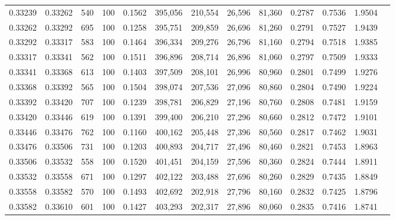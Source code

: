 \begin{tabular}{rrrrrrrrrrrrr}
0.33239 & 0.33262 &    540 & 100 &                                     0.1562 & 395,056 & 210,554 &  26,596 &  81,360 & 0.2787 & 0.7536 & 1.9504 \\
0.33262 & 0.33292 &    695 & 100 &                                     0.1258 & 395,751 & 209,859 &  26,696 &  81,260 & 0.2791 & 0.7527 & 1.9439 \\
0.33292 & 0.33317 &    583 & 100 &                                     0.1464 & 396,334 & 209,276 &  26,796 &  81,160 & 0.2794 & 0.7518 & 1.9385 \\
0.33317 & 0.33341 &    562 & 100 &                                     0.1511 & 396,896 & 208,714 &  26,896 &  81,060 & 0.2797 & 0.7509 & 1.9333 \\
0.33341 & 0.33368 &    613 & 100 &                                     0.1403 & 397,509 & 208,101 &  26,996 &  80,960 & 0.2801 & 0.7499 & 1.9276 \\
0.33368 & 0.33392 &    565 & 100 &                                     0.1504 & 398,074 & 207,536 &  27,096 &  80,860 & 0.2804 & 0.7490 & 1.9224 \\
0.33392 & 0.33420 &    707 & 100 &                                     0.1239 & 398,781 & 206,829 &  27,196 &  80,760 & 0.2808 & 0.7481 & 1.9159 \\
0.33420 & 0.33446 &    619 & 100 &                                     0.1391 & 399,400 & 206,210 &  27,296 &  80,660 & 0.2812 & 0.7472 & 1.9101 \\
0.33446 & 0.33476 &    762 & 100 &                                     0.1160 & 400,162 & 205,448 &  27,396 &  80,560 & 0.2817 & 0.7462 & 1.9031 \\
0.33476 & 0.33506 &    731 & 100 &                                     0.1203 & 400,893 & 204,717 &  27,496 &  80,460 & 0.2821 & 0.7453 & 1.8963 \\
0.33506 & 0.33532 &    558 & 100 &                                     0.1520 & 401,451 & 204,159 &  27,596 &  80,360 & 0.2824 & 0.7444 & 1.8911 \\
0.33532 & 0.33558 &    671 & 100 &                                     0.1297 & 402,122 & 203,488 &  27,696 &  80,260 & 0.2829 & 0.7435 & 1.8849 \\
0.33558 & 0.33582 &    570 & 100 &                                     0.1493 & 402,692 & 202,918 &  27,796 &  80,160 & 0.2832 & 0.7425 & 1.8796 \\
0.33582 & 0.33610 &    601 & 100 &                                     0.1427 & 403,293 & 202,317 &  27,896 &  80,060 & 0.2835 & 0.7416 & 1.8741 \\

\end{tabular}

